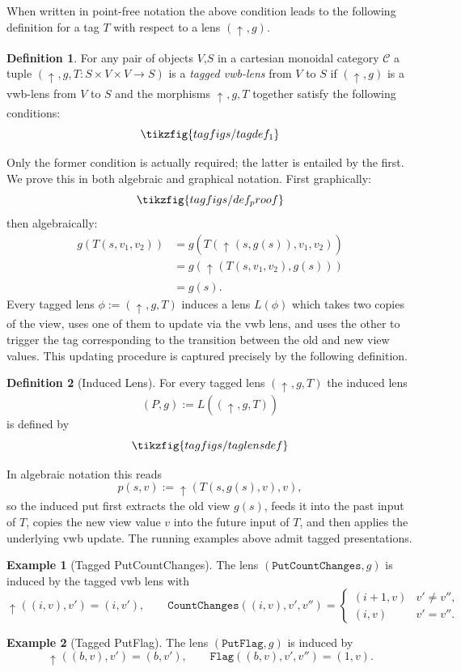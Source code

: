 \documentclass[a4paper,11pt]{article}
\newcommand{\putt}[1]{\mathbin{\uparrow_{#1}}}
\theoremstyle{definition}
\newtheorem{defn}{Definition}
\theoremstyle{plain}
\theoremstyle{plain}
\theoremstyle{definition}
\newtheorem{example}{Example}
\begin{document}
When written in point-free notation the above condition leads to the following definition for a tag $T$ with respect to a lens $(\putt{},g)$.
\begin{defn}
For any pair of objects $V$,$S$ in a cartesian monoidal category $\mathcal{C}$ a tuple $(\putt{},g,T:S \times V \times V \rightarrow S)$ is a \textit{tagged vwb-lens} from $V$ to $S$ if $(\putt{},g)$ is a vwb-lens from $V$ to $S$ and the morphisms $\putt{},g,T$ together satisfy the following conditions:
\[\tikzfig{tagfigs/tagdef_1}\]
\end{defn}
Only the former condition is actually required; the latter is entailed by the first. We prove this in both algebraic and graphical notation. First graphically:
\[\tikzfig{tagfigs/def_proof}\]
then algebraically:
\begin{align*}
    g(T(s,v_1,v_2)) & = g(T(\putt{}(s,g(s)),v_1,v_2)) \\
    & = g(\putt{}(T(s,v_1,v_2),g(s))) \\
    & = g(s).
\end{align*}
Every tagged lens $\phi := (\putt{},g,T)$ induces a lens $L(\phi)$ which takes two copies of the view, uses one of them to update via the vwb lens, and uses the other to trigger the tag corresponding to the transition between the old and new view values. This updating procedure is captured precisely by the following definition.
\begin{defn}[Induced Lens]
For every tagged lens $(\putt{},g,T)$ the induced lens \[(P,g):=L((\putt{},g,T))\] is defined by \[\tikzfig{tagfigs/taglensdef}\]
\end{defn}
In algebraic notation this reads \[p(s,v) := \putt{}(T(s,g(s),v),v),\] so the induced put first extracts the old view $g(s)$, feeds it into the past input of $T$, copies the new view value $v$ into the future input of $T$, and then applies the underlying vwb update. The running examples above admit tagged presentations.
\begin{example}[Tagged PutCountChanges]
The lens $(\texttt{PutCountChanges},g)$ is induced by the tagged vwb lens with
\[
\putt{}((i,v),v')=(i,v'),
\qquad
\texttt{CountChanges}((i,v),v',v'')=
\begin{cases}
(i+1,v) & v' \neq v'',\\
(i,v) & v' = v''.
\end{cases}
\]
\end{example}
\begin{example}[Tagged PutFlag]
The lens $(\texttt{PutFlag},g)$ is induced by
\[
\putt{}((b,v),v')=(b,v'),
\qquad
\texttt{Flag}((b,v),v',v'')=(1,v).
\]
\end{example}
\end{document}
